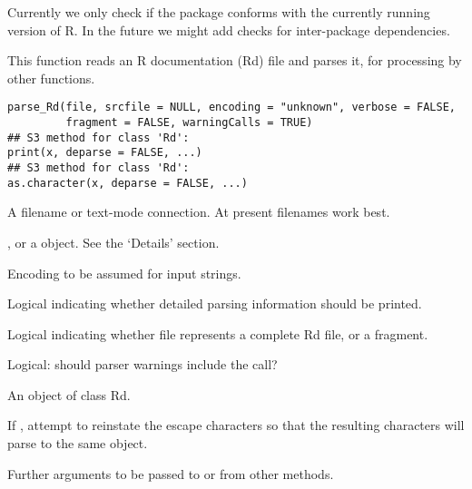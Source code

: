 %
\begin{Details}\relax
Currently we only check if the package conforms with the currently
running version of R.  In the future we might add checks for 
inter-package dependencies.
\end{Details}
%
\begin{SeeAlso}\relax
{}
\end{SeeAlso}
%
\begin{Description}\relax
This function reads an R documentation (Rd) file and parses it, for
processing by other functions.
\end{Description}
%
\begin{Usage}
\begin{verbatim}
parse_Rd(file, srcfile = NULL, encoding = "unknown", verbose = FALSE,
         fragment = FALSE, warningCalls = TRUE)
## S3 method for class 'Rd':
print(x, deparse = FALSE, ...)
## S3 method for class 'Rd':
as.character(x, deparse = FALSE, ...)
\end{verbatim}
\end{Usage}
%
\begin{Arguments}
\begin{ldescription}
\item[\code{file}] A filename or text-mode connection.  At present filenames
work best.
\item[\code{srcfile}] , or a  object.  See the
`Details' section.
\item[\code{encoding}] Encoding to be assumed for input strings.
\item[\code{verbose}] Logical indicating whether detailed parsing
information should be printed.
\item[\code{fragment}] Logical indicating whether file represents a complete
Rd file, or a fragment.
\item[\code{warningCalls}] Logical: should parser warnings include the call?
\item[\code{x}] An object of class Rd.
\item[\code{deparse}] If , attempt to reinstate the escape characters
so that the resulting characters will parse to the same object.
\item[\code{...}] Further arguments to be passed to or from other methods.
\end{ldescription}
\end{Arguments}
